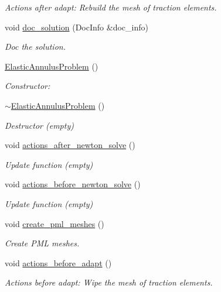\begin{DoxyCompactItemize}
\begin{DoxyCompactList}\small\item\em Actions after adapt\+: Rebuild the mesh of traction elements. \end{DoxyCompactList}\item 
void \hyperlink{classElasticAnnulusProblem_ab2952a8591047f62f9f66cfe29a533de}{doc\+\_\+solution} (Doc\+Info \&doc\+\_\+info)
\begin{DoxyCompactList}\small\item\em Doc the solution. \end{DoxyCompactList}\item 
\hyperlink{classElasticAnnulusProblem_aedf3d30576ccc20e2d8aa809cf075228}{Elastic\+Annulus\+Problem} ()
\begin{DoxyCompactList}\small\item\em Constructor\+: \end{DoxyCompactList}\item 
\hyperlink{classElasticAnnulusProblem_a7e791acd99dc0ae25ab9f2e2fd07c587}{$\sim$\+Elastic\+Annulus\+Problem} ()
\begin{DoxyCompactList}\small\item\em Destructor (empty) \end{DoxyCompactList}\item 
void \hyperlink{classElasticAnnulusProblem_adfb87876ac9981899c6c0b4caf0786f9}{actions\+\_\+after\+\_\+newton\+\_\+solve} ()
\begin{DoxyCompactList}\small\item\em Update function (empty) \end{DoxyCompactList}\item 
void \hyperlink{classElasticAnnulusProblem_af50a0dc2601e1a5e884166941d2cb9ce}{actions\+\_\+before\+\_\+newton\+\_\+solve} ()
\begin{DoxyCompactList}\small\item\em Update function (empty) \end{DoxyCompactList}\item 
void \hyperlink{classElasticAnnulusProblem_a0d2b0cc613caaca7c8f1a78c80b40bc7}{create\+\_\+pml\+\_\+meshes} ()
\begin{DoxyCompactList}\small\item\em Create P\+ML meshes. \end{DoxyCompactList}\item 
void \hyperlink{classElasticAnnulusProblem_abc8f38dd49a37b06212c168588301900}{actions\+\_\+before\+\_\+adapt} ()
\begin{DoxyCompactList}\small\item\em Actions before adapt\+: Wipe the mesh of traction elements. \end{DoxyCompactList}\item 

\end{DoxyCompactItemize}
